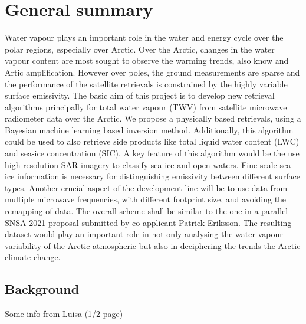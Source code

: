 \documentclass[12pt,oneside,a4paper]{article}
\begin{document}
	
	
	\thispagestyle{empty}
	\vspace*{-10mm}
	\noindent
	\textbf{\Large \LongTitle}




\section{General summary}

Water vapour plays an important role in the water and energy cycle over the polar regions, especially over Arctic. Over the Arctic, changes in the water vapour content are most sought to observe the warming trends, also know and Artic amplification. However over poles, the ground measurements are sparse and the performance of the satellite retrievals is constrained by the highly variable surface emissivity. The basic aim of this project is to develop new retrieval algorithms principally for total water vapour (TWV) from satellite microwave radiometer data over the Arctic. We propose a physically based retrievals, using a Bayesian machine learning based inversion method. Additionally, this algorithm could be used to also retrieve side products like total liquid water content (LWC) and sea-ice concentration (SIC). A key feature of this algorithm would be the use high resolution SAR imagery to classify sea-ice and open waters. Fine scale sea-ice information is necessary for distinguishing emissivity between different surface types. Another crucial aspect of the development line will be to use data from multiple microwave frequencies, with different footprint size, and avoiding the remapping of data. The overall scheme shall be similar to the one in a parallel SNSA 2021 proposal submitted by co-applicant Patrick Eriksson.
The resulting dataset would play an important role in not only analysing the water vapour variability of the Arctic atmospheric but also in deciphering the trends the Arctic climate change.


\subsection{Background}
%
\label{sec:background}
Some info from Luisa (1/2 page)
\end{document}
